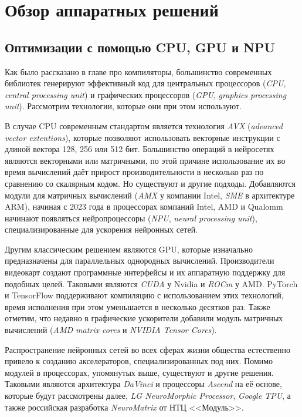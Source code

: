 \section{Обзор аппаратных решений}
\label{sec:Architecture} 

\subsection{Оптимизации с помощью CPU, GPU и NPU}

Как было рассказано в главе про компиляторы, большинство современных библиотек
генерируют эффективный код для центральных процессоров (\textit{CPU},
\textit{central processing unit}) и графических процессоров (\textit{GPU},
\textit{graphics processing unit}). Рассмотрим технологии, которые они при
этом используют.

В случае CPU современным стандартом является технология \textit{AVX}
(\textit{advanced vector extentions}), которые позволяют использовать векторные
инструкции с длиной вектора 128, 256 или 512 бит. Большинство операций в
нейросетях являются векторными или матричными, по этой причине использование
их во время вычислений даёт прирост производительности в несколько раз по
сравнению со скалярным кодом. Но существуют и другие подходы. Добавляются
модули для матричных вычислений (\textit{AMX} у компании Intel, \textit{SME} в
архитектуре ARM), начиная с 2023 года в процессорах компаний Intel, AMD и
Qualomm начинают появляться нейропроцессоры (\textit{NPU},
\textit{neural processing unit}), специализированные для ускорения нейронных
сетей.

Другим классическим решением являются GPU, которые изначально предназначены
для параллельных однородных вычислений. Производители видеокарт создают
программные интерфейсы и их аппаратную поддержку для подобных целей. Таковыми
являются \textit{CUDA} у Nvidia и \textit{ROCm} у AMD. PyTorch и TensorFlow
поддерживают компиляцию с использованием этих технологий, время исполнения при
этом уменьшается в несколько десятков раз. Также отметим, что недавно в
графические ускорители добавили модуль матричных вычислений
(\textit{AMD matrix cores} и \textit{NVIDIA Tensor Cores}).

Распространение нейронных сетей во всех сферах жизни общества естественно
привело к созданию акселераторов, специализированных под них. Помимо модулей
в процессорах, упомянутых выше, существуют и другие решения. Таковыми являются
архитектура \textit{DaVinci} и процессоры \textit{Ascend} на её основе, которые
будут рассмотрены далее, \textit{LG NeuroMorphic Processor},
\textit{Google TPU}, а также российская разработка \textit{NeuroMatrix} от
НТЦ <<Модуль>>.

